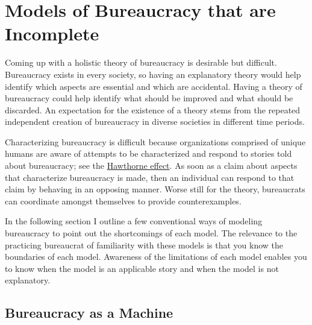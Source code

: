 \section{Models of Bureaucracy that are Incomplete\label{sec:models-of-bureaucracy}}

Coming up with a holistic theory of bureaucracy is desirable but difficult. Bureaucracy exists in every society, so having an explanatory theory would help identify which aspects are essential and which are accidental. Having a theory of bureaucracy could help identify what should be improved and what should be discarded. An expectation for the existence of a theory stems from the repeated independent creation of bureaucracy in diverse societies in different time periods. 

Characterizing bureaucracy is difficult because organizations comprised of unique humans are aware of attempts to be characterized and respond to stories told about bureaucracy; see the \href{https://en.wikipedia.org/wiki/Hawthorne_effect}{Hawthorne effect}.\iftoggle{boundbook}{\footnote{See the Wikipedia entry for the Hawthorne effect.}}{} 
\iftoggle{WPinmargin}{\marginpar{[Wikipedia] Hawthorne\\effect}}{}
As soon as a claim about aspects that characterize bureaucracy is made, then an individual can respond to that claim by behaving in an opposing manner. Worse still for the theory, bureaucrats can coordinate amongst themselves to provide counterexamples. 

In the following section I outline a few conventional ways of modeling bureaucracy to point out the shortcomings of each model. The relevance to the practicing bureaucrat of familiarity with these models is that you know the boundaries of each model. Awareness of the limitations of each model enables you to know when the model is an applicable story and when the model is not explanatory. 

\subsection*{Bureaucracy as a Machine}

